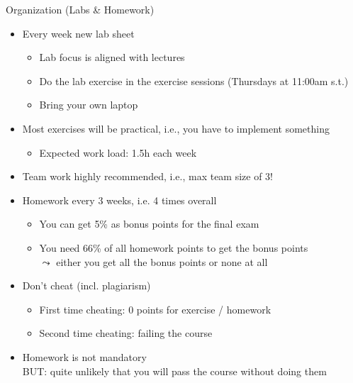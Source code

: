 \documentclass[aspectratio=169]{../latex_main/tntbeamer}  %
\begin{document}
\begin{frame}[c]{Organization (Labs \& Homework)}

\vspace{-1em}
\begin{itemize}
  \item Every week new lab sheet
  \begin{itemize}
      \item Lab focus is aligned with lectures
      \item Do the lab exercise in the exercise sessions (Thursdays at 11:00am s.t.)
      \item Bring your own laptop
  \end{itemize}
  \item Most exercises will be practical, i.e., you have to implement something
  \begin{itemize}
    \item Expected work load: 1.5h each week
  \end{itemize}
  \item Team work highly recommended, i.e., max team size of 3!
  \pause
  \item Homework every 3 weeks, i.e. 4 times overall
  \begin{itemize}
      \item You can get \alert{5\% as bonus points} for the final exam
      \item You need 66\% of all homework points to get the bonus points\\
      $\leadsto$ either you get all the bonus points or none at all
  \end{itemize}
  \pause
  \item Don't cheat (incl. plagiarism)
  \begin{itemize}
    \item First time cheating: $0$ points for exercise / homework
    \item Second time cheating: failing the course
  \end{itemize}
  \pause
  \item Homework is not mandatory\\ \alert{BUT: quite unlikely that you will pass the course without doing them}
  \pause
\end{itemize}

\end{frame}
\end{document}
